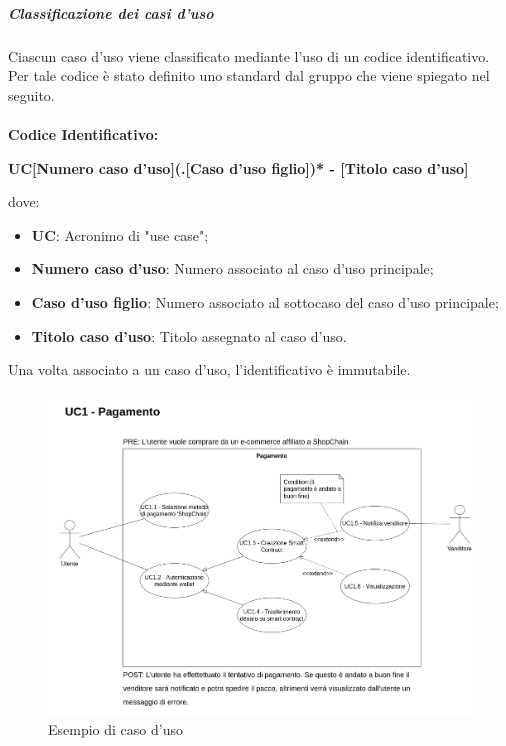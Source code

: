             \subparagraph{Classificazione dei casi d'uso} \label{subparagraph:Classificazione dei casi d'uso}
            Ciascun caso d'uso viene classificato mediante l'uso di un codice identificativo. Per tale codice è stato definito uno standard dal gruppo che viene spiegato nel seguito.\\\\
            \textbf{Codice Identificativo:}\\
            \begin{center}
                \textbf{\Large{UC[Numero caso d'uso](.[Caso d'uso figlio])* - [Titolo caso d'uso]}}
            \end{center}
            dove:
            \begin{itemize}[label={}]
                \item \textbf{UC}: Acronimo di "use case";
                \item \textbf{Numero caso d'uso}: Numero associato al caso d'uso principale;
                \item \textbf{Caso d'uso figlio}: Numero associato al sottocaso del caso d'uso principale;
                \item \textbf{Titolo caso d'uso}: Titolo assegnato al caso d'uso.
            \end{itemize}

            Una volta associato a un caso d'uso, l'identificativo è immutabile.
            \begin{figure}[H]
                \centering
                \includegraphics[scale=0.3]{../template/images/useCases/useCase.png}
                \caption{Esempio di caso d'uso}
            \end{figure}
            
